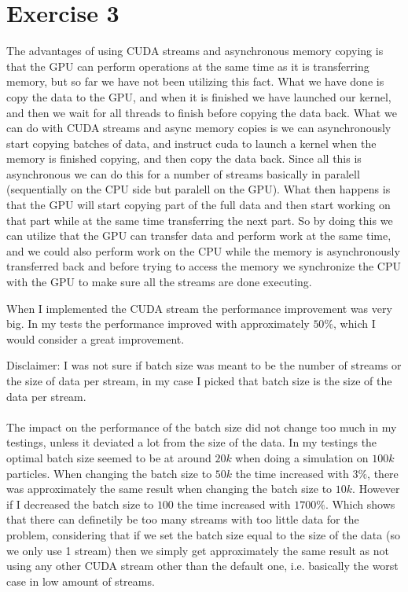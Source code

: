 \documentclass[a4paper, 12pt]{article}
\begin{document}


\section{Exercise 3}
The advantages of using CUDA streams and asynchronous memory copying is that the GPU can perform operations at the same time as it is transferring memory, but so far we have not been utilizing this fact. What we have done is copy the data to the GPU, and when it is finished we have launched our kernel, and then we wait for all threads to finish before copying the data back. What we can do with CUDA streams and async memory copies is we can asynchronously start copying batches of data, and instruct cuda to launch a kernel when the memory is finished copying, and then copy the data back. Since all this is asynchronous we can do this for a number of streams basically in paralell (sequentially on the CPU side but paralell on the GPU). What then happens is that the GPU will start copying part of the full data and then start working on that part while at the same time transferring the next part. So by doing this we can utilize that the GPU can transfer data and perform work at the same time, and we could also perform work on the CPU while the memory is asynchronously transferred back and before trying to access the memory we synchronize the CPU with the GPU to make sure all the streams are done executing.

When I implemented the CUDA stream the performance improvement was very big. In my tests the performance improved with approximately $50\%$, which I would consider a great improvement.

\newpage
Disclaimer: I was not sure if batch size was meant to be the number of streams or the size of data per stream, in my case I picked that batch size is the size of the data per stream.
\\\\
The impact on the performance of the batch size did not change too much in my testings, unless it deviated a lot from the size of the data. In my testings the optimal batch size seemed to be at around $20k$ when doing a simulation on $100k$ particles. When changing the batch size to $50k$ the time increased with $3\%$, there was approximately the same result when changing the batch size to $10k$. However if I decreased the batch size to $100$ the time increased with $1700\%$. Which shows that there can definetily be too many streams with too little data for the problem, considering that if we set the batch size equal to the size of the data (so we only use 1 stream) then we simply get approximately the same result as not using any other CUDA stream other than the default one, i.e. basically the worst case in low amount of streams.
\end{document}
